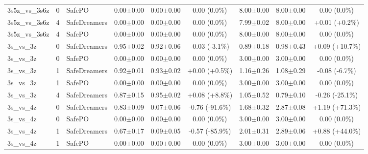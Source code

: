 \documentclass{article}
\begin{document}
\begin{longtable}{lclcccccc}
3s5z\_vs\_3s6z & 0 & SafePO & 0.00$\pm$0.00 & 0.00$\pm$0.00 & \textcolor{red!40!black}{0.00 (0.0\%)} & 8.00$\pm$0.00 & 8.00$\pm$0.00 & \textcolor{green!40!black}{0.00 (0.0\%)} \\
3s5z\_vs\_3s6z & 4 & SafeDreamers & 0.00$\pm$0.00 & 0.00$\pm$0.00 & \textcolor{red!40!black}{0.00 (0.0\%)} & 7.99$\pm$0.02 & 8.00$\pm$0.00 & \textcolor{red!40!black}{+0.01 (+0.2\%)} \\
3s5z\_vs\_3s6z & 4 & SafePO & 0.00$\pm$0.00 & 0.00$\pm$0.00 & \textcolor{red!40!black}{0.00 (0.0\%)} & 8.00$\pm$0.00 & 8.00$\pm$0.00 & \textcolor{green!40!black}{0.00 (0.0\%)} \\
\midrule
3s\_vs\_3z & 0 & SafeDreamers & 0.95$\pm$0.02 & 0.92$\pm$0.06 & \textcolor{red!40!black}{-0.03 (-3.1\%)} & 0.89$\pm$0.18 & 0.98$\pm$0.43 & \textcolor{red!55!black}{+0.09 (+10.7\%)} \\
3s\_vs\_3z & 0 & SafePO & 0.00$\pm$0.00 & 0.00$\pm$0.00 & \textcolor{red!40!black}{0.00 (0.0\%)} & 3.00$\pm$0.00 & 3.00$\pm$0.00 & \textcolor{green!40!black}{0.00 (0.0\%)} \\
3s\_vs\_3z & 1 & SafeDreamers & 0.92$\pm$0.01 & 0.93$\pm$0.02 & \textcolor{green!40!black}{+0.00 (+0.5\%)} & 1.16$\pm$0.26 & 1.08$\pm$0.29 & \textcolor{green!55!black}{-0.08 (-6.7\%)} \\
3s\_vs\_3z & 1 & SafePO & 0.00$\pm$0.00 & 0.00$\pm$0.00 & \textcolor{red!40!black}{0.00 (0.0\%)} & 3.00$\pm$0.00 & 3.00$\pm$0.00 & \textcolor{green!40!black}{0.00 (0.0\%)} \\
3s\_vs\_3z & 4 & SafeDreamers & 0.87$\pm$0.15 & 0.95$\pm$0.02 & \textcolor{green!55!black}{+0.08 (+8.8\%)} & 1.05$\pm$0.52 & 0.79$\pm$0.10 & \textcolor{green!70!black}{-0.26 (-25.1\%)} \\
\midrule
3s\_vs\_4z & 0 & SafeDreamers & 0.83$\pm$0.09 & 0.07$\pm$0.06 & \textcolor{red!100!black}{-0.76 (-91.6\%)} & 1.68$\pm$0.32 & 2.87$\pm$0.08 & \textcolor{red!100!black}{+1.19 (+71.3\%)} \\
3s\_vs\_4z & 0 & SafePO & 0.00$\pm$0.00 & 0.00$\pm$0.00 & \textcolor{red!40!black}{0.00 (0.0\%)} & 3.00$\pm$0.00 & 3.00$\pm$0.00 & \textcolor{green!40!black}{0.00 (0.0\%)} \\
3s\_vs\_4z & 1 & SafeDreamers & 0.67$\pm$0.17 & 0.09$\pm$0.05 & \textcolor{red!100!black}{-0.57 (-85.9\%)} & 2.01$\pm$0.31 & 2.89$\pm$0.06 & \textcolor{red!85!black}{+0.88 (+44.0\%)} \\
3s\_vs\_4z & 1 & SafePO & 0.00$\pm$0.00 & 0.00$\pm$0.00 & \textcolor{red!40!black}{0.00 (0.0\%)} & 3.00$\pm$0.00 & 3.00$\pm$0.00 & \textcolor{green!40!black}{0.00 (0.0\%)} \\

\end{longtable}
\end{document}

